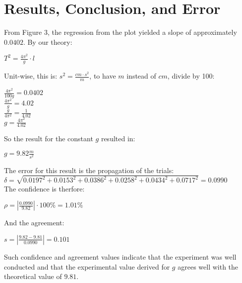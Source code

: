 \documentclass{article}
\begin{document}
\clearpage
\section{Results, Conclusion, and Error}

From Figure 3, the regression from the plot yielded a slope of approximately $0.0402$.
By our theory:\\

\begin{center}
  {$T^2 = \frac{4 \pi^2}{g} \cdot l$}
\end{center}

Unit-wise, this is: {$s^2 = \frac{cm \cdot s^2}{m}$}, to have $m$ instead of $cm$, divide by 100:\\

\begin{center}
  {$\frac{4\pi^{2}}{100g} = 0.0402$}\\
  {$\frac{4\pi^{2}}{g} = 4.02$}\\
  {$\frac{g}{4\pi^{2}} = \frac{1}{4.02}$}\\
  {$g = \frac{4\pi^{2}}{4.02}$}\\
\end{center}

So the result for the constant $g$ resulted in:

\begin{center}
  {$g = 9.82 \frac{m}{s^{2}}$}\\
\end{center}

The error for this result is the propagation of the trials:\\

{$\delta = \sqrt{0.0197^2 + 0.0153^2 + 0.0386^2 + 0.0258^2 + 0.0434^2 + 0.0717^2} = 0.0990$}\\

The confidence is therfore:\\

\begin{center}
  {$\rho = |{\frac{0.0990}{9.82}}| \cdot 100\% = 1.01 \%$}
\end{center}

And the agreement:

\begin{center}
  {$s = |{\frac{9.82 - 9.81}{0.0990}}| = 0.101$}
\end{center}

Such confidence and agreement values indicate that the experiment was well conducted and that the
experimental value derived for $g$ agrees well with the theoretical value of $9.81$.\\
\end{document}
